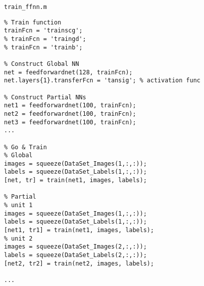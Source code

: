 \documentclass[12pt,a4paper]{article}
\begin{document}
\verb|train_ffnn.m|
\begin{lstlisting}
% Train function
trainFcn = 'trainscg';
% trainFcn = 'traingd';
% trainFcn = 'trainb';

% Construct Global NN
net = feedforwardnet(128, trainFcn);
net.layers{1}.transferFcn = 'tansig'; % activation func

% Construct Partial NNs
net1 = feedforwardnet(100, trainFcn);
net2 = feedforwardnet(100, trainFcn);
net3 = feedforwardnet(100, trainFcn);
...

% Go & Train
% Global
images = squeeze(DataSet_Images(1,:,:));
labels = squeeze(DataSet_Labels(1,:,:));
[net, tr] = train(net1, images, labels);

% Partial
% unit 1
images = squeeze(DataSet_Images(1,:,:));
labels = squeeze(DataSet_Labels(1,:,:));
[net1, tr1] = train(net1, images, labels);
% unit 2
images = squeeze(DataSet_Images(2,:,:));
labels = squeeze(DataSet_Labels(2,:,:));
[net2, tr2] = train(net2, images, labels);

...
\end{lstlisting}

\newpage
\newpage
\tableofcontents
\end{document}
